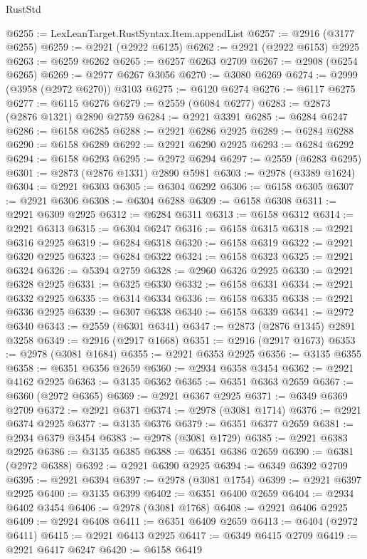 \begin{lexlean}{RustStd}
\begin{coremodule}
@6255 := LexLeanTarget.RustSyntax.Item.appendList
@6257 := @2916 (@3177 @6255)
@6259 := @2921 (@2922 @6125)
@6262 := @2921 (@2922 @6153) @2925
@6263 := @6259 @6262
@6265 := @6257 @6263 @2709
@6267 := @2908 (@6254 @6265)
@6269 := @2977 @6267 @3056
@6270 := @3080 @6269
@6274 := @2999 (@3958 (@2972 @6270)) @3103
@6275 := @6120 @6274
@6276 := @6117 @6275
@6277 := @6115 @6276
@6279 := @2559 (@6084 @6277)
@6283 := @2873 (@2876 @1321) @2890 @2759
@6284 := @2921 @3391
@6285 := @6284 @6247
@6286 := @6158 @6285
@6288 := @2921 @6286 @2925
@6289 := @6284 @6288
@6290 := @6158 @6289
@6292 := @2921 @6290 @2925
@6293 := @6284 @6292
@6294 := @6158 @6293
@6295 := @2972 @6294
@6297 := @2559 (@6283 @6295)
@6301 := @2873 (@2876 @1331) @2890 @5981
@6303 := @2978 (@3389 @1624)
@6304 := @2921 @6303
@6305 := @6304 @6292
@6306 := @6158 @6305
@6307 := @2921 @6306
@6308 := @6304 @6288
@6309 := @6158 @6308
@6311 := @2921 @6309 @2925
@6312 := @6284 @6311
@6313 := @6158 @6312
@6314 := @2921 @6313
@6315 := @6304 @6247
@6316 := @6158 @6315
@6318 := @2921 @6316 @2925
@6319 := @6284 @6318
@6320 := @6158 @6319
@6322 := @2921 @6320 @2925
@6323 := @6284 @6322
@6324 := @6158 @6323
@6325 := @2921 @6324
@6326 := @5394 @2759
@6328 := @2960 @6326 @2925
@6330 := @2921 @6328 @2925
@6331 := @6325 @6330
@6332 := @6158 @6331
@6334 := @2921 @6332 @2925
@6335 := @6314 @6334
@6336 := @6158 @6335
@6338 := @2921 @6336 @2925
@6339 := @6307 @6338
@6340 := @6158 @6339
@6341 := @2972 @6340
@6343 := @2559 (@6301 @6341)
@6347 := @2873 (@2876 @1345) @2891 @3258
@6349 := @2916 (@2917 @1668)
@6351 := @2916 (@2917 @1673)
@6353 := @2978 (@3081 @1684)
@6355 := @2921 @6353 @2925
@6356 := @3135 @6355
@6358 := @6351 @6356 @2659
@6360 := @2934 @6358 @3454
@6362 := @2921 @4162 @2925
@6363 := @3135 @6362
@6365 := @6351 @6363 @2659
@6367 := @6360 (@2972 @6365)
@6369 := @2921 @6367 @2925
@6371 := @6349 @6369 @2709
@6372 := @2921 @6371
@6374 := @2978 (@3081 @1714)
@6376 := @2921 @6374 @2925
@6377 := @3135 @6376
@6379 := @6351 @6377 @2659
@6381 := @2934 @6379 @3454
@6383 := @2978 (@3081 @1729)
@6385 := @2921 @6383 @2925
@6386 := @3135 @6385
@6388 := @6351 @6386 @2659
@6390 := @6381 (@2972 @6388)
@6392 := @2921 @6390 @2925
@6394 := @6349 @6392 @2709
@6395 := @2921 @6394
@6397 := @2978 (@3081 @1754)
@6399 := @2921 @6397 @2925
@6400 := @3135 @6399
@6402 := @6351 @6400 @2659
@6404 := @2934 @6402 @3454
@6406 := @2978 (@3081 @1768)
@6408 := @2921 @6406 @2925
@6409 := @2924 @6408
@6411 := @6351 @6409 @2659
@6413 := @6404 (@2972 @6411)
@6415 := @2921 @6413 @2925
@6417 := @6349 @6415 @2709
@6419 := @2921 @6417 @6247
@6420 := @6158 @6419

\end{coremodule}
\end{lexlean}
